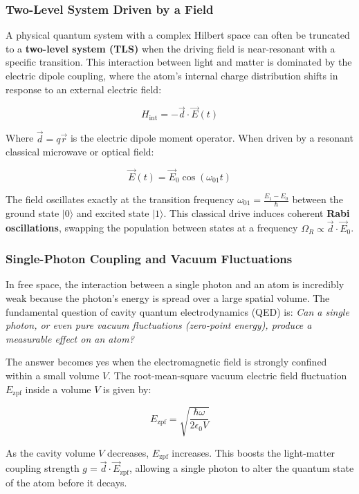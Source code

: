 \documentclass[
]{article}
\begin{document}
\subsubsection{Two-Level System Driven by a
Field}\label{two-level-system-driven-by-a-field}

A physical quantum system with a complex Hilbert space can often be
truncated to a \textbf{two-level system (TLS)} when the driving field is
near-resonant with a specific transition. This interaction between light
and matter is dominated by the electric dipole coupling, where the
atom's internal charge distribution shifts in response to an external
electric field:

\[H_{\text{int}} = -\vec{d} \cdot \vec{E}(t)\]

Where \(\vec{d} = q\vec{r}\) is the electric dipole moment operator.
When driven by a resonant classical microwave or optical field:

\[\vec{E}(t) = \vec{E}_0 \cos(\omega_{01} t)\]

The field oscillates exactly at the transition frequency
\(\omega_{01} = \frac{E_1 - E_0}{\hbar}\) between the ground state
\(|0\rangle\) and excited state \(|1\rangle\). This classical drive
induces coherent \textbf{Rabi oscillations}, swapping the population
between states at a frequency
\(\Omega_R \propto \vec{d} \cdot \vec{E}_0\).

\subsubsection{Single-Photon Coupling and Vacuum
Fluctuations}\label{single-photon-coupling-and-vacuum-fluctuations}

In free space, the interaction between a single photon and an atom is
incredibly weak because the photon's energy is spread over a large
spatial volume. The fundamental question of cavity quantum
electrodynamics (QED) is: \emph{Can a single photon, or even pure vacuum
fluctuations (zero-point energy), produce a measurable effect on an
atom?}

The answer becomes yes when the electromagnetic field is strongly
confined within a small volume \(V\). The root-mean-square vacuum
electric field fluctuation \(E_{\text{zpf}}\) inside a volume \(V\) is
given by:

\[E_{\text{zpf}} = \sqrt{\frac{\hbar \omega}{2 \epsilon_0 V}}\]

As the cavity volume \(V\) decreases, \(E_{\text{zpf}}\) increases. This
boosts the light-matter coupling strength
\(g = \vec{d} \cdot \vec{E}_{\text{zpf}}\), allowing a single photon to
alter the quantum state of the atom before it decays.
\end{document}

